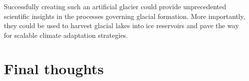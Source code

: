 Successfully creating such an artificial glacier could provide unprecedented scientific insights in the
processes governing glacial formation. More importantly, they could be used to harvest glacial lakes into ice
reservoirs and pave the way for scalable climate adaptation strategies.

\section{Final thoughts}














